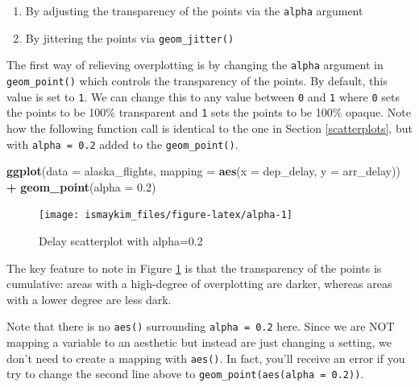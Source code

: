 \documentclass[12pt,]{krantz}
\makeatletter
\newenvironment{Shaded}{\begin{snugshade}}{\end{snugshade}}
\newcommand{\KeywordTok}[1]{\textcolor[rgb]{0.27,0.27,0.27}{\textbf{#1}}}
\newcommand{\DataTypeTok}[1]{\textcolor[rgb]{0.27,0.27,0.27}{#1}}
\newcommand{\FloatTok}[1]{\textcolor[rgb]{0.06,0.06,0.06}{#1}}
\newcommand{\StringTok}[1]{\textcolor[rgb]{0.5,0.5,0.5}{#1}}
\newcommand{\OperatorTok}[1]{\textcolor[rgb]{0.43,0.43,0.43}{\textbf{#1}}}
\newcommand{\NormalTok}[1]{#1}
\providecommand{\tightlist}{%
  \setlength{\itemsep}{0pt}\setlength{\parskip}{0pt}}
\newenvironment{kframe}{%
\medskip{}
\setlength{\fboxsep}{.8em}
 \def\at@end@of@kframe{}%
 \ifinner\ifhmode%
  \def\at@end@of@kframe{\end{minipage}}%
  \begin{minipage}{\columnwidth}%
 \fi\fi%
 \def\FrameCommand##1{\hskip\@totalleftmargin \hskip-\fboxsep
 \colorbox{shadecolor}{##1}\hskip-\fboxsep
     \hskip-\linewidth \hskip-\@totalleftmargin \hskip\columnwidth}%
 \MakeFramed {\advance\hsize-\width
   \@totalleftmargin\z@ \linewidth\hsize
   \@setminipage}}%
 {\par\unskip\endMakeFramed%
 \at@end@of@kframe}
\renewenvironment{Shaded}{\begin{kframe}}{\end{kframe}}
\theoremstyle{definition}
\theoremstyle{definition}
\theoremstyle{definition}
\theoremstyle{remark}
\makeatother
\begin{document}
\begin{enumerate}
\def\labelenumi{\arabic{enumi}.}
\tightlist
\item
  By adjusting the transparency of the points via the \texttt{alpha}
  argument
\item
  By jittering the points via \texttt{geom\_jitter()}
\end{enumerate}

The first way of relieving overplotting is by changing the
\texttt{alpha} argument in \texttt{geom\_point()} which controls the
transparency of the points. By default, this value is set to \texttt{1}.
We can change this to any value between \texttt{0} and \texttt{1} where
\texttt{0} sets the points to be 100\% transparent and \texttt{1} sets
the points to be 100\% opaque. Note how the following function call is
identical to the one in Section \ref{scatterplots}, but with
\texttt{alpha\ =\ 0.2} added to the \texttt{geom\_point()}.

\begin{Shaded}
\begin{Highlighting}[]
\KeywordTok{ggplot}\NormalTok{(}\DataTypeTok{data =}\NormalTok{ alaska_flights, }
       \DataTypeTok{mapping =} \KeywordTok{aes}\NormalTok{(}\DataTypeTok{x =}\NormalTok{ dep_delay, }\DataTypeTok{y =}\NormalTok{ arr_delay)) }\OperatorTok{+}\StringTok{ }
\StringTok{  }\KeywordTok{geom_point}\NormalTok{(}\DataTypeTok{alpha =} \FloatTok{0.2}\NormalTok{)}
\end{Highlighting}
\end{Shaded}

\begin{figure}

{\centering \texttt{[image: ismaykim\_files/figure-latex/alpha-1]} 

}

\caption{Delay scatterplot with alpha=0.2}\label{fig:alpha}
\end{figure}

The key feature to note in Figure \ref{fig:alpha} is that the
transparency of the points is cumulative: areas with a high-degree of
overplotting are darker, whereas areas with a lower degree are less
dark.

Note that there is no \texttt{aes()} surrounding \texttt{alpha\ =\ 0.2}
here. Since we are NOT mapping a variable to an aesthetic but instead
are just changing a setting, we don't need to create a mapping with
\texttt{aes()}. In fact, you'll receive an error if you try to change
the second line above to \texttt{geom\_point(aes(alpha\ =\ 0.2))}.
\end{document}
